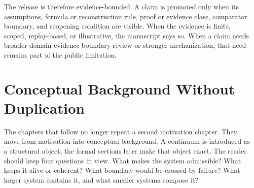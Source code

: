 The release is therefore evidence-bounded. A claim is promoted only when its
assumptions, formula or reconstruction rule, proof or evidence class,
comparator boundary, and reopening condition are visible. When the evidence is
finite, scoped, replay-based, or illustrative, the manuscript says so. When a
claim needs broader domain evidence-boundary review or stronger mechanization, that need
remains part of the public limitation.

\section{Conceptual Background Without Duplication}
\label{sec:r007-conceptual-background}

The chapters that follow no longer repeat a second motivation chapter. They
move from motivation into conceptual background. A continuum is introduced as a
structural object; the formal sections later make that object exact. The reader
should keep four questions in view. What makes the system admissible? What keeps
it alive or coherent? What boundary would be crossed by failure? What larger
system contains it, and what smaller systems compose it?
